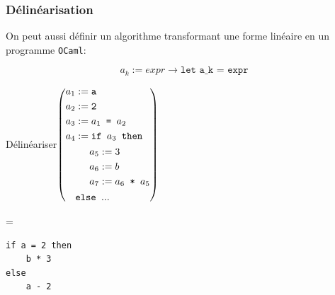 \addtocounter{framenumber}{-1}
\begin{frame}[fragile,t]
    \frametitle{Délinéarisation}

    On peut aussi définir un algorithme transformant une forme linéaire en un
    programme \texttt{OCaml}:

    $$a_k := expr \longrightarrow \texttt{let a\_k = expr}$$

    \vspace{0.5cm}

    \begin{minipage}{0.5\textwidth}
        Délinéariser\small$\left(\begin{aligned}
                    a_1 & := \texttt{a}                                \\
                    a_2 & := \texttt{2}                                \\
                    a_3 & := a_1 \texttt{ = } a_2                      \\
                    a_4 & := \texttt{if } a_3 \texttt{ then}           \\
                        & \hspace{0.5cm} \begin{aligned}
                                             a_5 & := 3                    \\
                                             a_6 & := b                    \\
                                             a_7 & := a_6 \texttt{ * } a_5
                                         \end{aligned} \\
                        & \texttt{else } ...
                \end{aligned}\right)$
    \end{minipage}=%
    \begin{minipage}{0.45\textwidth}
        \small \begin{verbatim}
if a = 2 then
    b * 3
else
    a - 2
            \end{verbatim}
    \end{minipage}
\end{frame}

